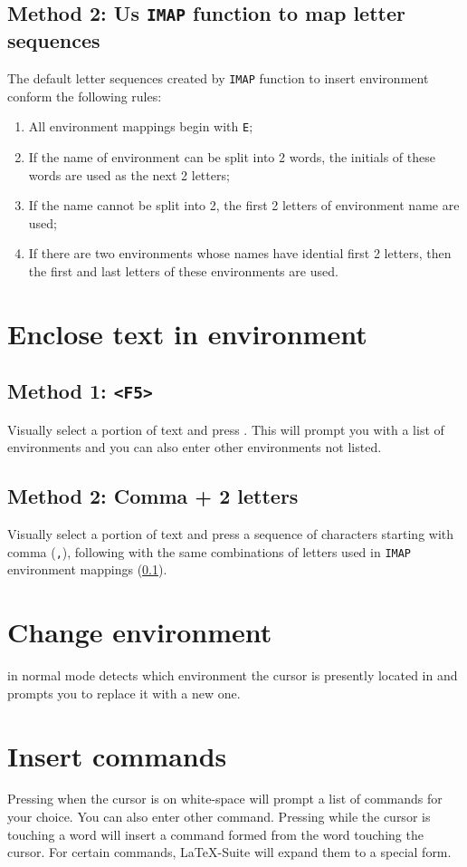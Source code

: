 \documentclass{article}
\newcommand{\syntax}[1]{\PVerb{#1}}
\begin{document}
\subsection{Method 2: Us \texttt{IMAP} function to map letter sequences}
\label{sec:IMAPmapEnvironment}
The default letter sequences created by \texttt{IMAP} function to insert environment conform the following rules:
\begin{enumerate}
  \item All environment mappings begin with \verb|E|;
  \item If the name of environment can be split into 2 words, the initials of these words are used as the next 2 letters;
  \item If the name cannot be split into 2, the first 2 letters of environment name are used;
  \item If there are two environments whose names have idential first 2 letters, then the first and last letters of these environments are used.
\end{enumerate}

\section{Enclose text in environment}
\subsection{Method 1: \texttt{<F5>}}
Visually select a portion of text and press \syntax{<F5>}. This will prompt you with a list of environments and you can also enter other environments not listed.
\subsection{Method 2: Comma + 2 letters}
Visually select a portion of text and press a sequence of characters starting with comma (\verb|,|), following with the same combinations of letters used in \texttt{IMAP} environment mappings (\cref{sec:IMAPmapEnvironment}).
\section{Change environment}
\syntax{<S-F5>} in normal mode detects which environment the cursor is presently located in and prompts you to replace it with a new one.

\section{Insert commands}
Pressing \syntax{<F7>} when the cursor is on white-space will prompt a list of commands for your choice. You can also enter other command.
Pressing \syntax{<F7>} while the cursor is touching a word will insert a command formed from the word touching the cursor. For certain commands, \LaTeX{}-Suite will expand them to a special form.
\end{document}
